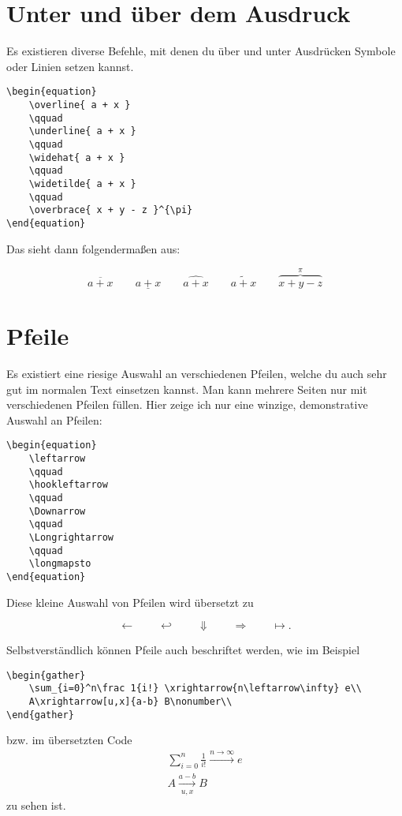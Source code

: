 \section{Unter und über dem Ausdruck}

Es existieren diverse Befehle, mit denen du über und unter Ausdrücken Symbole oder Linien setzen kannst.

\begin{lstlisting}
\begin{equation}
	\overline{ a + x }
	\qquad
	\underline{ a + x }
	\qquad
	\widehat{ a + x }
	\qquad
	\widetilde{ a + x }
	\qquad
	\overbrace{ x + y - z }^{\pi}
\end{equation}
\end{lstlisting} 

Das sieht dann folgendermaßen aus:

\begin{equation}
	\overline{ a + x }
	\qquad
	\underline{ a + x }
	\qquad
	\widehat{ a + x }
	\qquad
	\widetilde{ a + x }
	\qquad
	\overbrace{ x + y - z }^{\pi}
\end{equation}

\section{Pfeile}

Es existiert eine riesige Auswahl an verschiedenen Pfeilen, welche du auch sehr gut im normalen Text einsetzen kannst. Man kann mehrere Seiten nur mit verschiedenen Pfeilen füllen. Hier zeige ich nur eine winzige, demonstrative Auswahl an Pfeilen:

\begin{lstlisting}
\begin{equation}
	\leftarrow
	\qquad
	\hookleftarrow
	\qquad
	\Downarrow
	\qquad
	\Longrightarrow
	\qquad
	\longmapsto
\end{equation}
\end{lstlisting} 

Diese kleine Auswahl von Pfeilen wird übersetzt zu

\begin{equation}
	\leftarrow
	\qquad
	\hookleftarrow
	\qquad
	\Downarrow
	\qquad
	\Longrightarrow
	\qquad
	\longmapsto.
\end{equation}

Selbstverständlich können Pfeile auch beschriftet werden, wie im Beispiel
\begin{lstlisting}
\begin{gather}
	\sum_{i=0}^n\frac 1{i!} \xrightarrow{n\leftarrow\infty} e\\
	A\xrightarrow[u,x]{a-b} B\nonumber\\
\end{gather}
\end{lstlisting}
bzw. im übersetzten Code
\begin{gather}
	\sum_{i=0}^n\frac 1{i!} \xrightarrow{n\rightarrow\infty} e\\
	A\xrightarrow[u,x]{a-b} B\nonumber
\end{gather}
zu sehen ist.

